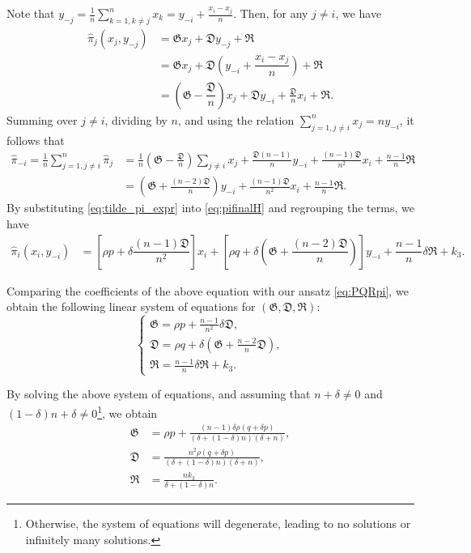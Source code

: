 \documentclass[11pt]{article}
\numberwithin{equation}{section}
\providecommand{\smn}{{-}} %
\begin{document}
Note that \(y_{-j}=\frac{1}{n}\sum^n_{k=1, k\neq j}x_k = y_{-i}+\frac{x_i-x_j}{n}\). Then, for any \(j\neq i\), we have
  \begin{align*}
  \widehat{\pi}_j(x_j,y_{\smn j}) & = \mathfrak{G}x_j + \mathfrak{D}y_{-j} + \mathfrak{R} \\
  	& = \mathfrak{G}x_j + \mathfrak{D}\left(y_{-i}+\dfrac{x_i-x_j}{n}\right) + \mathfrak{R}\\
  & =  \left(\mathfrak{G}-\dfrac{\mathfrak{D}}{n}\right)x_j + \mathfrak{D} y_{\smn i} + \frac{\mathfrak{D}}{n}x_i + \mathfrak{R}.
  \end{align*}
  Summing over \(j\neq i\), dividing by \(n\), and using the relation \(\sum^n_{j=1, j\neq i}x_j = ny_{\smn i}\), it follows that
  \begin{align}
  \widehat{{\pi}}_{-i}	= \frac{1}{n}\sum^n_{j=1, j\neq i}\widehat{\pi}_j &= \frac{1}{n}\left(\mathfrak{G}-\frac{\mathfrak{D}}{n}\right)\sum_{j\neq i}x_j + \frac{\mathfrak{D}(n-1)}{n}y_{\smn i} + \frac{(n-1)\mathfrak{D}}{n^2}x_i  + \frac{n-1}{n}\mathfrak{R}\\
& = \left(\mathfrak{G}+\frac{(n-2)\mathfrak{D}}{n}\right)y_{\smn i} + \frac{(n-1)\mathfrak{D}}{n^2}x_i + \frac{n-1}{n}\mathfrak{R}.
  \label{eq:tilde_pi_expr}
  \end{align}
  By substituting \eqref{eq:tilde_pi_expr} into \eqref{eq:pifinalH} and regrouping the terms, we have
  \begin{align*}
  	\widehat{\pi}_i(x_i, y_{\smn i}) &= \left[\rho p+\delta\dfrac{(n-1)\mathfrak{D}}{n^2}\right]x_i + \left[\rho q+\delta\left(\mathfrak{G}+\dfrac{(n-2)\mathfrak{D}}{n}\right)\right]y_{\smn i}
  + \dfrac{n-1}{n} \delta\mathfrak{R} + k_3.
  \end{align*}

  Comparing the coefficients of the above equation with our ansatz \eqref{eq:PQRpi}, we obtain the following linear system of equations for \((\mathfrak{G}, \mathfrak{D}, \mathfrak{R})\):
  \begin{equation}
  	\begin{cases}
  		\mathfrak{G} = \rho p + \frac{n-1}{n^2}\delta\mathfrak{D}, \\
  		\mathfrak{D} = \rho q + \delta\left(\mathfrak{G}+\frac{n-2}{n}\mathfrak{D}\right), \\
  		\mathfrak{R}= \frac{n-1}{n}\delta\mathfrak{R} + k_3.
  	\end{cases}
  \end{equation}

By solving the above system of equations, and assuming that $n + \delta \neq 0$ and $(1 - \delta)n + \delta \neq 0$\footnote{Otherwise, the system of equations will degenerate, leading to no solutions or infinitely many solutions.}, we obtain
  \begin{align}
  		\mathfrak{G} &= \rho p + \frac{(n-1)\delta\rho (q + \delta p)}{(\delta+(1-\delta)n)(\delta+n)}, \label{eq:fG}\\
      \mathfrak{D} &= \frac{n^2 \rho (q + \delta p)}{(\delta+(1-\delta)n)(\delta+n)}, \label{eq:fD}\\
  		\mathfrak{R} &= \frac{nk_3}{\delta + (1 - \delta)n}. \label{eq:fR}
  \end{align}
\end{document}
